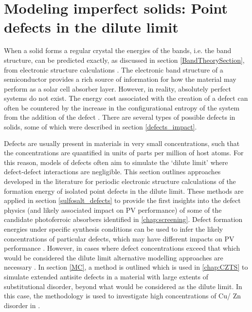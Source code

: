 \documentclass[11pt, twoside]{report}
\begin{document}
\section{Modeling imperfect solids: Point defects in the dilute limit}\label{defects_methods}
When a solid forms a regular crystal the energies of the bands, i.e. the band structure, can be predicted exactly, as discussed in section \ref{BandTheorySection}, from electronic structure calculations \cite{Nelson3}.
The electronic band structure of a semiconductor provides a rich source of information for how the material may perform as a solar cell absorber layer. However, in reality, absolutely perfect systems do not exist. The energy cost associated with the creation of a defect can often be countered by the increase in the configurational entropy of the system from the addition of the defect \cite{AshcroftMermin_general}.
There are several types of possible defects in solids, some of which were described in section \ref{defects_impact}. 

Defects are usually present in materials in very small concentrations, such that the concentrations are quantified in units of parts per million of host atoms. For this reason, models of defects often aim to simulate the `dilute limit' where defect-defect interactions are negligible. This section outlines approaches developed in the literature for periodic electronic structure calculations of the formation energy of isolated point defects in the dilute limit.
These methods are applied in section \ref{sulfosalt_defects} to provide the first insights into the defect physics (and likely associated impact on PV performance) of some of the candidate photoferroic absorbers identified in \autoref{chap:screening}. 
Defect formation energies under specific synthesis conditions can be used to infer the likely concentrations of particular defects, which may have different impacts on PV performance \cite{Aron_defect_tolerance}. 
However, in cases where defect concentrations exceed that which would be considered the dilute limit alternative modelling approaches are necessary \cite{high_defect_conc_method, defects_beyond_dilute_lim}. In section \ref{MC}, a method is outlined which is used in \autoref{chap:CZTS} to simulate extended antisite defects in a material with large extents of substitutional disorder, beyond what would be considered as the dilute limit. In this case, the methodology is used to investigate high concentrations of Cu/ Zn disorder in {\CZTS}. 
\end{document}
